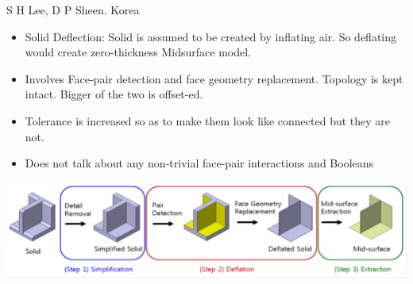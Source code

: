 \begin{frame}[<+-| alert@+>]{S H Lee, D P Sheen. Korea  \cite{Sheen2008}}


\begin{itemize}[noitemsep,label=\textbullet,topsep=2pt,parsep=2pt,partopsep=2pt]
	\item Solid Deflection: Solid is assumed to be created by inflating air. So deflating would create zero-thickness Midsurface model.
	\item Involves Face-pair detection and face geometry replacement. Topology is kept intact.
Bigger of the two is offset-ed. 
	\item Tolerance is increased so as to make them look like connected but they are not.
	\item Does not talk about any non-trivial face-pair interactions and Booleans

	\end{itemize}

	\includegraphics[scale=0.4]{../Common/images/Sheen.png}

\end{frame}


